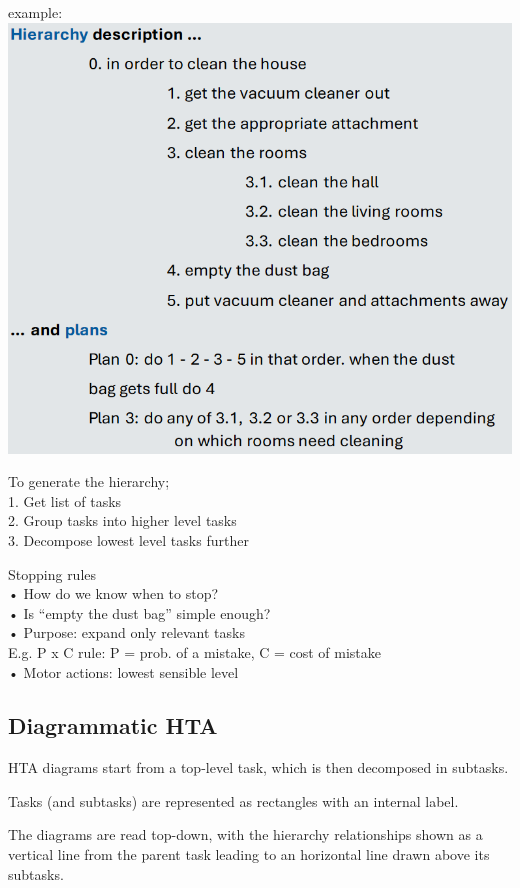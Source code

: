 \documentclass[]{project_plan}
\begin{document}
example:
\includegraphics[width=\linewidth]{textual_HTA_description.png}

To generate the hierarchy;\\
1. Get list of tasks\\
2. Group tasks into higher level tasks\\
3. Decompose lowest level tasks further

Stopping rules\\
• How do we know when to stop?\\
• Is “empty the dust bag” simple enough?\\
• Purpose: expand only relevant tasks\\
E.g. P x C rule: P = prob. of a mistake, C = cost of mistake\\
• Motor actions: lowest sensible level

\subsection{Diagrammatic HTA}

HTA diagrams start from a top-level task, which is then decomposed in subtasks.

Tasks (and subtasks) are represented as rectangles with an internal label.

The diagrams are read top-down, with the hierarchy relationships shown as a vertical
line from the parent task leading to an horizontal line drawn above its subtasks.
\end{document}

